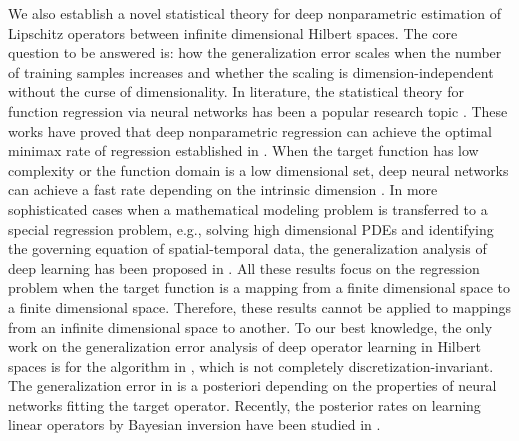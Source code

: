 \documentclass[11pt]{article} %
\begin{document}
We also establish a novel statistical theory for deep nonparametric estimation of Lipschitz operators between infinite dimensional Hilbert spaces. The core question to be answered is: how the generalization error scales when the number of training samples increases and whether the scaling is dimension-independent without the curse of dimensionality. In literature, the statistical theory for function regression via neural networks has been a popular research topic \citep{hamers2006nonasymptotic,kohler2005adaptive,Arthur18,10.1214/18-AOS1747,schmidt2020nonparametric,Yuan1,chen2019nonparametric,kohler2020estimation,JMLR:v21:20-002,Farrell_2021,hao2021icml,Jiao2021DeepNR}. These works have proved that deep nonparametric regression can achieve the optimal minimax rate of regression established in \citep{10.1214/aos/1176345969,gyorfi2002distribution}. When the target function has low complexity or the function domain is a low dimensional set, deep neural networks can achieve a fast rate depending on the intrinsic dimension \citep{chen2019efficient,chen2019nonparametric,chen2020doubly,hao2021icml,shijun2,Jiao2021DeepNR,cloninger2020relu,shaham2018provable,schmidt2019deep,du2021discovery,nakada2020adaptive}. In more sophisticated cases when a mathematical modeling problem is transferred to a special regression problem, e.g., solving high dimensional PDEs and identifying the governing equation of spatial-temporal data, the generalization analysis of deep learning has been proposed in \citep{DBLP:journals/corr/abs-1809-03062,shin2020convergence,Luo2020,mishra2020estimates,lu2021priori,lu2021priori2,duan2021convergence,gu2021stationary}. All these results focus on the regression problem when the target function is a mapping from a finite dimensional space to a finite dimensional space. Therefore, these results cannot be applied to mappings from an infinite dimensional space to another. To our best knowledge, the only work on the generalization error analysis of deep operator learning in Hilbert spaces is \citep{lanthaler2021error} for the algorithm in \citep{deeponet}, which is not completely discretization-invariant.  The generalization error in \citep{lanthaler2021error} is a posteriori depending on the properties of neural networks fitting the target operator. Recently, the posterior rates on learning linear operators by Bayesian inversion have been studied in \citep{de2021convergence}.
\end{document}

